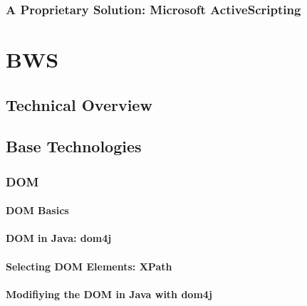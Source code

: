     
    
  \subsubsection{A Proprietary Solution: Microsoft ActiveScripting}
  \label{sec:activescripting}
    
     
\section{BWS}

 

 \subsection{Technical Overview}
  
  
  
 \subsection{Base Technologies}
 \label{sec:BaseTechnologies}
  
  
  
  \subsubsection{DOM}
  
   
   
   \paragraph{DOM Basics}
   
    
    
   \paragraph{DOM in Java: dom4j}
    
    
    
   \paragraph{Selecting DOM Elements: XPath}
   
    
   
   \paragraph{Modifiying the DOM in Java with dom4j}
   
